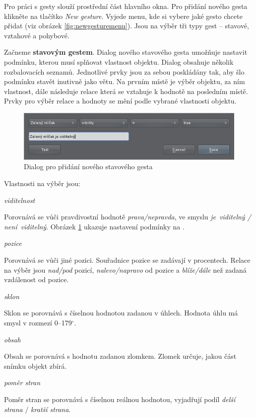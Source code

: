 Pro práci s gesty slouží prostřední část hlavního okna. Pro přidání nového
gesta klikněte na tlačítko \emph{New gesture}. Vyjede menu, kde si vybere jaké
gesto chcete přidat (viz obrázek \ref{fig:newgesturemenu}). Jsou na výběr tři
typy gest -- stavové, vztahové a pohybové.

Začneme \textbf{stavovým gestem}. Dialog nového stavového gesta umožňuje nastavit
podmínku, kterou musí splňovat vlastnost objektu. Dialog obsahuje několik
rozbalovacích seznamů. Jednotlivé prvky jsou za sebou poskládány tak, aby šlo
podmínku stavět inutivně jako větu. Na prvním místě je výběr objektu, za ním
vlastnost, dále následuje relace která se vztahuje k hodnotě na posledním
místě. Prvky pro výběr relace a hodnoty se mění podle vybrané vlastnosti
objektu.

\begin{figure}[h]
\centering
\includegraphics[width=1.1\textwidth]{newstategesture.png}
\caption{Dialog pro přidání nového stavového gesta}
\label{fig:newstategesture}
\end{figure}

Vlastnosti na výběr jsou:
\begin{itemize_compact}
    \item \emph{viditelnost}
    
    Porovnává se vůči pravdivostní hodnotě \emph{prava/nepravda}, ve smyslu
    \emph{je~viditelný / není~viditelný}. Obrázek \ref{fig:newstategesture}
    ukazuje nastavení podmínky na .

    \item \emph{pozice}

    Porovnává se vůči jiné pozici. Souřadnice pozice se zadávají v procentech.
    Relace na výběr jsou \emph{nad/pod} pozicí, \emph{nalevo/napravo}
    od pozice a \emph{blíže/dále} než zadaná vzdálenost od pozice.

    \item \emph{sklon}\nopagebreak

    Sklon se porovnává s číselnou hodnotou zadanou v úhlech. Hodnota úhlu má
    smysl v rozmezí 0--179$^{\circ}$.

    \item \emph{obsah}

    Obsah se porovnává s hodnotu zadanou zlomkem. Zlomek určuje, jakou část
    snímku objekt zbírá.

    \item \emph{poměr stran}

    Poměr stran se porovnává s číselnou reálnou hodnotou, vyjadřují podíl
    \emph{delší strana} $/$ \emph{kratší strana}.
\end{itemize_compact}

